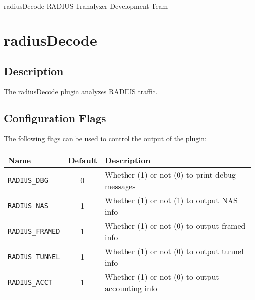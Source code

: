 \documentclass[documentation]{subfiles}
\begin{document}
\trantitle
    {radiusDecode}
    {RADIUS}
    {Tranalyzer Development Team} %

\section{radiusDecode}\label{s:radiusDecode}

\subsection{Description}
The radiusDecode plugin analyzes RADIUS traffic.

\subsection{Configuration Flags}
The following flags can be used to control the output of the plugin:
\begin{longtable}{lcl}
    \toprule
    {\bf Name} & {\bf Default} & {\bf Description} \\
    \midrule\endhead%
    {\tt RADIUS\_DBG} & 0 & Whether (1) or not (0) to print debug messages\\
    {\tt RADIUS\_NAS} & 1 & Whether (1) or not (1) to output NAS info\\
    {\tt RADIUS\_FRAMED} & 1 & Whether (1) or not (0) to output framed info\\
    {\tt RADIUS\_TUNNEL} & 1 & Whether (1) or not (0) to output tunnel info\\
    {\tt RADIUS\_ACCT} & 1 & Whether (1) or not (0) to output accounting info\\
    \bottomrule
\end{longtable}
\end{document}
